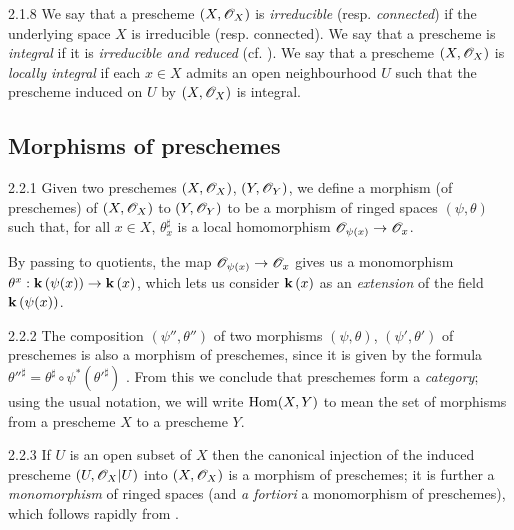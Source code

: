 \begin{env}{2.1.8}
\label{env-1.2.1.8}
We say that a prescheme $(X,\mathscr{O}_X)$ is \emph{irreducible}
(resp. \emph{connected}) if the underlying space $X$ is irreducible (resp.
connected). We say that a prescheme is \emph{integral} if it is
\emph{irreducible and reduced} (cf. ). We say that a prescheme
$(X,\mathscr{O}_X)$ is \emph{locally integral} if each $x\in X$ admits an open
neighbourhood $U$ such that the prescheme induced on $U$ by $(X,\mathscr{O}_X)$ is integral.
\end{env}

\subsection{Morphisms of preschemes}
\label{1-schemes-2.2}

\begin{envs}[Definition]{2.2.1}
\label{defn-1.2.2.1}
Given two preschemes $(X,\mathscr{O}_X)$, $(Y,\mathscr{O}_Y)$, we
define a morphism (of preschemes) of $(X,\mathscr{O}_X)$ to $(Y,\mathscr{O}_Y)$ to be a morphism
of ringed spaces $(\psi,\theta)$ such that, for all $x\in X$, $\theta_x^\sharp$ is a
local homomorphism $\mathscr{O}_{\psi(x)}\to\mathscr{O}_x$.
\end{envs}

By passing to quotients, the map $\mathscr{O}_{\psi(x)}\to\mathscr{O}_x$ gives us a monomorphism
$\theta^x:\mathbf{k}\,(\psi(x))\to\mathbf{k}\,(x)$, which lets us consider $\mathbf{k}\,(x)$ as an
\emph{extension} of the field $\mathbf{k}\,(\psi(x))$.

\begin{env}{2.2.2}
\label{env-1.2.2.2}
The composition $(\psi'',\theta'')$ of two morphisms
$(\psi,\theta)$, $(\psi',\theta')$ of preschemes is also a morphism of
preschemes, since it is given by the formula
${\theta''}^\sharp=\theta^\sharp\circ\psi^*({\theta'}^\sharp)$ . From this
we conclude that preschemes form a \emph{category}; using the usual notation, we
will write ${\mathop{\mathrm{Hom}}\nolimits}(X,Y)$ to mean the set of morphisms from a prescheme $X$ to a
prescheme $Y$.
\end{env}

\begin{env}[Example]{2.2.3}
\label{exm-1.2.2.3}
If $U$ is an open subset of $X$ then the canonical
injection  of the induced prescheme $(U,\mathscr{O}_X|U)$ into
$(X,\mathscr{O}_X)$ is a morphism of preschemes; it is further a \emph{monomorphism} of
ringed spaces (and \emph{a fortiori} a monomorphism of preschemes), which
follows rapidly from .
\end{env}

